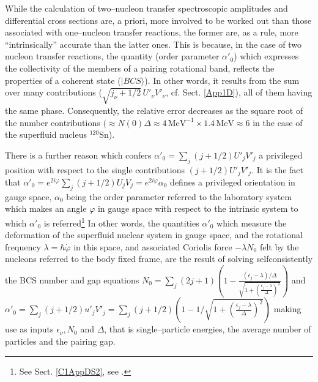 While the calculation of two--nucleon transfer spectroscopic amplitudes and differential cross sections are, a priori, more involved to be worked out than those associated with one--nucleon transfer reactions, the former are, as a rule, more ``intrinsically'' accurate than the latter ones. This is because, in the case of two nucleon transfer reactions, the quantity (order parameter $\alpha'_0$) which expresses the collectivity of the members of a pairing rotational band, reflects the properties of a coherent state ($|BCS\rangle$). In other words, it results from the sum over many contributions ($\sqrt{j_{\nu}+1/2}\,U'_\nu V'_\nu$, cf. Sect. \ref{App1D}), all of them having the same phase. Consequently, the relative error decreases as the square root of the number contributions $(\approx N(0)\Delta\approx 4\,\text{MeV}^{-1}\times 1.4\,\text{MeV}\approx 6$ in the case of the superfluid nucleus $^{120}$Sn). 

There is a further reason which confers $\alpha'_0=\sum_j(j+1/2)U'_jV'_j$ a privileged position with respect to the single contributions $(j+1/2)U'_jV'_j$. It is the fact that $\alpha'_0=e^{2i\varphi}\sum_j(j+1/2)U_jV_j=e^{2i\varphi}\alpha_0$ defines a privileged orientation in gauge space, $\alpha_0$ being the order parameter referred to the laboratory system which makes an angle $\varphi$ in gauge space with respect to the intrinsic system to which $\alpha'_0$ is referred\footnote{See Sect. \ref{C1AppDS2}, see \cite{Potel:13b}.} In other words, the quantities $\alpha'_0$ which measure the deformation of the superfluid nuclear system in gauge space, and the rotational frequency $\lambda=\hbar\dot\varphi$ in this space, and associated Coriolis force $-\lambda N_0$ felt by the nucleons referred to the body fixed frame, are the result of solving selfconsistently the BCS number and gap equations
$N_0=\sum_j(2j+1)\left(1-\frac{(\epsilon_j-\lambda)/\Delta}{\sqrt{1+\left(\frac{\epsilon_j-\lambda}{\Delta}\right)^2}}\right)$ and $\alpha'_0=\sum_j(j+1/2)u'_jV'_j=\sum_j(j+1/2)\left(1-1/\sqrt{1+(\frac{\epsilon_j-\lambda}{\Delta})^2}\right)$ making use as inputs $\epsilon_\nu, N_0$ and $\Delta$, that is single--particle energies, the average number of particles and the pairing gap.


